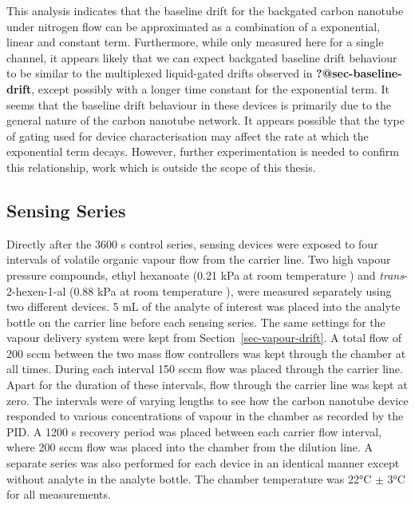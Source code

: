 \documentclass[
  a4paper,
]{scrbook}
\begin{document}
This analysis indicates that the baseline drift for the backgated carbon
nanotube under nitrogen flow can be approximated as a combination of a
exponential, linear and constant term. Furthermore, while only measured
here for a single channel, it appears likely that we can expect
backgated baseline drift behaviour to be similar to the multiplexed
liquid-gated drifts observed in \textbf{?@sec-baseline-drift}, except
possibly with a longer time constant for the exponential term. It seems
that the baseline drift behaviour in these devices is primarily due to
the general nature of the carbon nanotube network. It appears possible
that the type of gating used for device characterisation may affect the
rate at which the exponential term decays. However, further
experimentation is needed to confirm this relationship, work which is
outside the scope of this thesis.

\hypertarget{sec-vapour-series}{%
\subsection{Sensing Series}\label{sec-vapour-series}}

Directly after the 3600 s control series, sensing devices were exposed
to four intervals of volatile organic vapour flow from the carrier line.
Two high vapour pressure compounds, ethyl hexanoate (0.21 kPa at room
temperature \autocite{EtHex}) and \emph{trans}-2-hexen-1-al (0.88 kPa at
room temperature \autocite{E2Hex}), were measured separately using two
different devices. 5 mL of the analyte of interest was placed into the
analyte bottle on the carrier line before each sensing series. The same
settings for the vapour delivery system were kept from
Section~\ref{sec-vapour-drift}. A total flow of 200 sccm between the two
mass flow controllers was kept through the chamber at all times. During
each interval 150 sccm flow was placed through the carrier line. Apart
for the duration of these intervals, flow through the carrier line was
kept at zero. The intervals were of varying lengths to see how the
carbon nanotube device responded to various concentrations of vapour in
the chamber as recorded by the PID. A 1200 s recovery period was placed
between each carrier flow interval, where 200 sccm flow was placed into
the chamber from the dilution line. A separate series was also performed
for each device in an identical manner except without analyte in the
analyte bottle. The chamber temperature was 22°C \(\pm\) 3°C for all
measurements.
\end{document}
